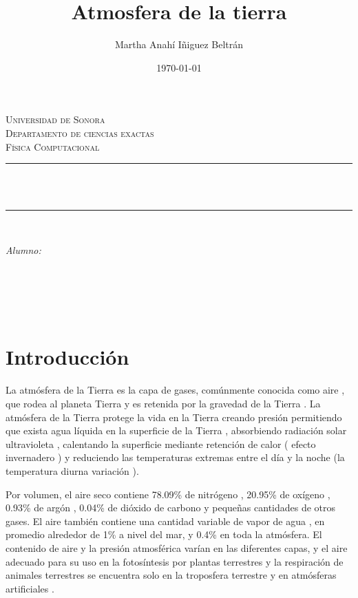 \documentclass[12pt]{article}
\title{Atmosfera de la tierra}								%
\author{Martha Anahí Iñiguez Beltrán}						%
\date{\today}											%
\makeatletter
\let\thetitle\@title
\let\theauthor\@author
\let\thedate\@date
\makeatother
\begin{document}
\begin{titlepage}
\centering
    \vspace*{0.5 cm}
    \textsc{\LARGE Universidad de Sonora}\\[2.0 cm]	%
    \textsc{\Large Departamento de ciencias exactas}\\[1.0 cm]
\textsc{\Large Física Computacional}\\[0.5 cm]
\rule{\linewidth}{0.2 mm} \\[0.4 cm]
{ \huge \bfseries \thetitle}\\
\rule{\linewidth}{0.2 mm} \\[1.5 cm]
\begin{minipage}{0.6\textwidth}
\begin{flushleft} \large
\emph{Alumno:}\\
\theauthor
\end{flushleft}
\end{minipage}~
\begin{minipage}{0.4\textwidth}
\begin{flushright} \large
\end{flushright}
\end{minipage}\\[2 cm]


{\large \thedate}\\[2 cm]

\vfill

\end{titlepage}


\tableofcontents
\pagebreak


\section{Introducción}
\noindent

La atmósfera de la Tierra es la capa de gases, comúnmente conocida como aire , que rodea al planeta Tierra y es retenida por la gravedad de la Tierra . La atmósfera de la Tierra protege la vida en la Tierra creando presión permitiendo que exista agua líquida en la superficie de la Tierra , absorbiendo radiación solar ultravioleta , calentando la superficie mediante retención de calor ( efecto invernadero ) y reduciendo las temperaturas extremas entre el día y la noche (la temperatura diurna variación ).

Por volumen, el aire seco contiene 78.09\% de nitrógeno , 20.95\% de oxígeno , 0.93\% de argón , 0.04\% de dióxido de carbono y pequeñas cantidades de otros gases. El aire también contiene una cantidad variable de vapor de agua , en promedio alrededor de 1\% a nivel del mar, y 0.4\% en toda la atmósfera. El contenido de aire y la presión atmosférica varían en las diferentes capas, y el aire adecuado para su uso en la fotosíntesis por plantas terrestres y la respiración de animales terrestres se encuentra solo en la troposfera terrestre y en atmósferas artificiales .
\end{document}
